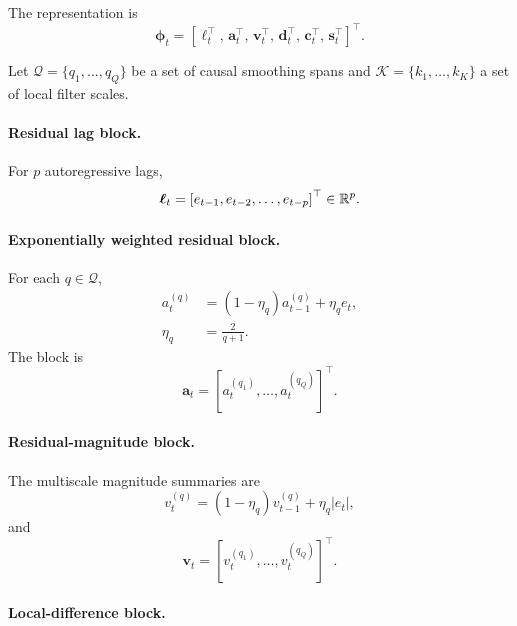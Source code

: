 \documentclass[review,number,sort&compress]{elsarticle}
\begin{document}
The representation is
\begin{equation}
    \bm{\phi}_t
    =
    \left[
    \bm{\ell}_t^\top,\,
    \bm{a}_t^\top,\,
    \bm{v}_t^\top,\,
    \bm{d}_t^\top,\,
    \bm{c}_t^\top,\,
    \bm{s}_t^\top
    \right]^\top.
    \label{eq:fast_feature_map}
\end{equation}

Let $\mathcal{Q}=\{q_1,\ldots,q_Q\}$ be a set of causal smoothing spans and
$\mathcal{K}=\{k_1,\ldots,k_K\}$ a set of local filter scales.

\paragraph{Residual lag block.}

For $p$ autoregressive lags,
\begin{equation}
    \bm{\ell}_t
    =
    \left[
    e_{t-1},
    e_{t-2},
    \ldots,
    e_{t-p}
    \right]^\top
    \in\mathbb{R}^p.
\end{equation}

\paragraph{Exponentially weighted residual block.}

For each $q\in\mathcal{Q}$,
\begin{align}
    a_t^{(q)}
    &=
    (1-\eta_q)a_{t-1}^{(q)}
    +
    \eta_qe_t,
    \\
    \eta_q
    &=
    \frac{2}{q+1}.
\end{align}
The block is
\begin{equation}
    \bm{a}_t
    =
    \left[
    a_t^{(q_1)},\ldots,a_t^{(q_Q)}
    \right]^\top.
\end{equation}

\paragraph{Residual-magnitude block.}

The multiscale magnitude summaries are
\begin{equation}
    v_t^{(q)}
    =
    (1-\eta_q)v_{t-1}^{(q)}
    +
    \eta_q|e_t|,
\end{equation}
and
\begin{equation}
    \bm{v}_t
    =
    \left[
    v_t^{(q_1)},\ldots,v_t^{(q_Q)}
    \right]^\top.
\end{equation}

\paragraph{Local-difference block.}
\end{document}
